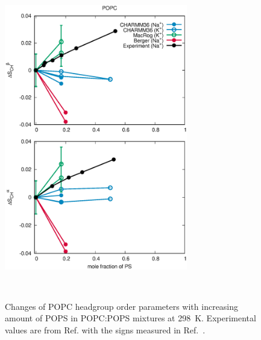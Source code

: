 \documentclass[aps,prl,superscriptaddress,twocolumn]{revtex4}
\begin{document}
\begin{figure}[!htb]
  \centering
  \includegraphics[width=8.0cm]{../Figs/HGorderparametersPCvsPS.eps}
  \caption{\label{HGorderparametersPCvsPS}
    Changes of POPC headgroup order parameters with increasing amount of POPS in POPC:POPS mixtures at 298~K.
    Experimental values are from Ref.  with the signs measured in Ref.~\cite{ferreira16}.
  }
   \\
\end{figure}
\end{document}
